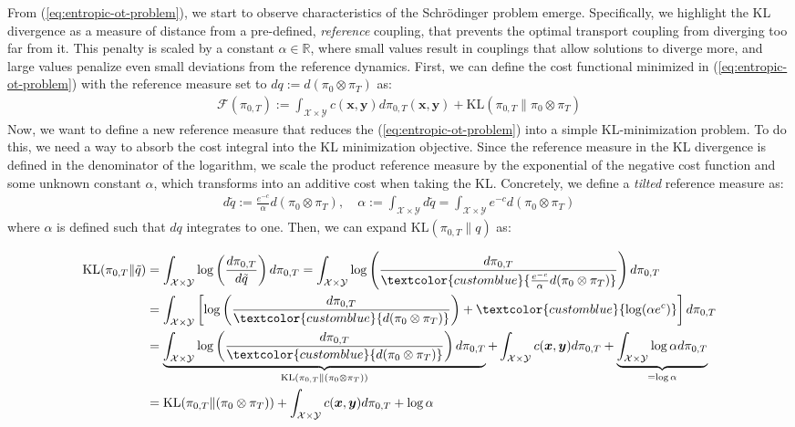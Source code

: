 \documentclass{article}
\newcommand{\bluetext}[1]{\textcolor{customblue}{#1}}
\begin{document}
From (\ref{eq:entropic-ot-problem}), we start to observe characteristics of the Schrödinger problem emerge. Specifically, we highlight the KL divergence as a measure of distance from a pre-defined, \textit{reference} coupling, that prevents the optimal transport coupling from diverging too far from it. This penalty is scaled by a constant $\alpha\in \mathbb{R}$, where small values result in couplings that allow solutions to diverge more, and large values penalize even small deviations from the reference dynamics. First, we can define the cost functional minimized in (\ref{eq:entropic-ot-problem}) with the reference measure set to $dq:=d(\pi_0\otimes \pi_T)$ as:
\begin{align}
    \mathcal{F}(\pi_{0,T}):=\int_{\mathcal{X}\times\mathcal{Y}}c(\boldsymbol{x},\boldsymbol{y})d\pi_{0,T}(\boldsymbol{x},\boldsymbol{y})+\text{KL}(\pi_{0,T}\|\pi_0\otimes \pi_T)\tag{EOT Functional}\label{eq:eot-functional}
\end{align}
Now, we want to define a new reference measure that reduces the (\ref{eq:entropic-ot-problem}) into a simple KL-minimization problem. To do this, we need a way to absorb the cost integral into the KL minimization objective. Since the reference measure in the KL divergence is defined in the denominator of the logarithm, we scale the product reference measure by the exponential of the negative cost function and some unknown constant $\alpha$, which transforms into an additive cost when taking the KL. Concretely, we define a \textit{tilted} reference measure as:
\begin{align}
    d\tilde{q}:=\frac{e^{-c}}{\alpha}d(\pi_0\otimes \pi_T), \quad \alpha:=\int_{\mathcal{X}\times\mathcal{Y}} d\tilde{q}=\int_{\mathcal{X}\times\mathcal{Y}}e^{-c}d(\pi_0\otimes \pi_T)
\end{align}
where $\alpha$ is defined such that $dq$ integrates to one. Then, we can expand $\text{KL}(\pi_{0,T}\|q)$ as:
\begin{small}
\begin{align}
    \text{KL}(\pi_{0,T}\|\tilde{q})&=\int_{\mathcal{X}\times\mathcal{Y}}\log \left(\frac{d\pi_{0,T}}{d\tilde{q}}\right)d\pi_{0,T}=\int_{\mathcal{X}\times \mathcal{Y}}\log \left(\frac{d\pi_{0,T}}{\bluetext{\frac{e^{-c}}{\alpha}d(\pi_0\otimes \pi_T)}}\right)d\pi_{0,T}\nonumber\\
    &=\int_{\mathcal{X}\times \mathcal{Y}}\left[\log \left(\frac{d\pi_{0,T}}{\bluetext{d(\pi_0\otimes \pi_T)}}\right)+\bluetext{\log (\alpha e^c)}\right]d\pi_{0,T}\nonumber\\
    &= \underbrace{\int_{\mathcal{X}\times \mathcal{Y}}\log \left(\frac{d\pi_{0,T}}{\bluetext{d(\pi_0\otimes \pi_T)}}\right)d\pi_{0,T}}_{\text{KL}(\pi_{0,T}\|(\pi_0\otimes\pi_T))}+\int_{\mathcal{X}\times \mathcal{Y}}c(\boldsymbol{x}, \boldsymbol{y})d\pi_{0,T}+ \underbrace{\int_{\mathcal{X}\times \mathcal{Y}} \log \alpha d\pi_{0,T}}_{= \log \alpha}\nonumber\\
    &=\text{KL}(\pi_{0,T}\|(\pi_0\otimes\pi_T))+\int_{\mathcal{X}\times \mathcal{Y}}c(\boldsymbol{x}, \boldsymbol{y})d\pi_{0,T}+\log \alpha
\end{align}
\end{small}
\end{document}
